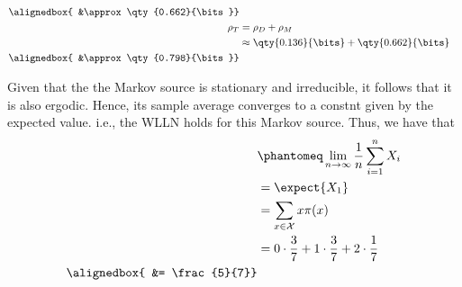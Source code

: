 \documentclass[
  coursecode={MTHE 474},
  assignmentname={Homework \homeworknumber},
  studentnumber=20053722,
  name={Bryan Hoang},
  draft,
]{
  ltxanswer%
}
\begin{document}
\begin{questions}
\begin{parts}
\begin{subparts}
\begin{solution}
\begin{align*}
            \alignedbox{ &\approx \qty{0.662}{\bits}}                                                                                                                                                                                                                     \\
            \rho_{T}     &= \rho_{D} + \rho_{M}                                                                                                                                                                                                                           \\
                         &\approx  \qty{0.136}{\bits} + \qty{0.662}{\bits}                                                                                                                                                                                                \\
            \alignedbox{ &\approx \qty{0.798}{\bits}}
          \end{align*}
        \end{solution}

        \subpart{}
        \begin{solution}
          Given that the the Markov source is stationary and irreducible, it follows that it is also ergodic. Hence, its sample average converges to a constnt given by the expected value. i.e., the WLLN holds for this Markov source. Thus, we have that
          \begin{align*}
                         &\phantomeq \lim_{n\to\infty} \frac{1}{n}\sum_{i=1}^{n} X_{i}      \\
                         &= \expect{X_{1}}                                                  \\
                         &= \sum_{x\in\mathcal{X}} x\pi(x)                                  \\
                         &= 0 \cdot \frac{3}{7} + 1 \cdot \frac{3}{7} + 2 \cdot \frac{1}{7} \\
            \alignedbox{ &= \frac{5}{7}}
          \end{align*}
        \end{solution}
      \end{subparts}
    \end{parts}
  \end{questions}
\end{document}
